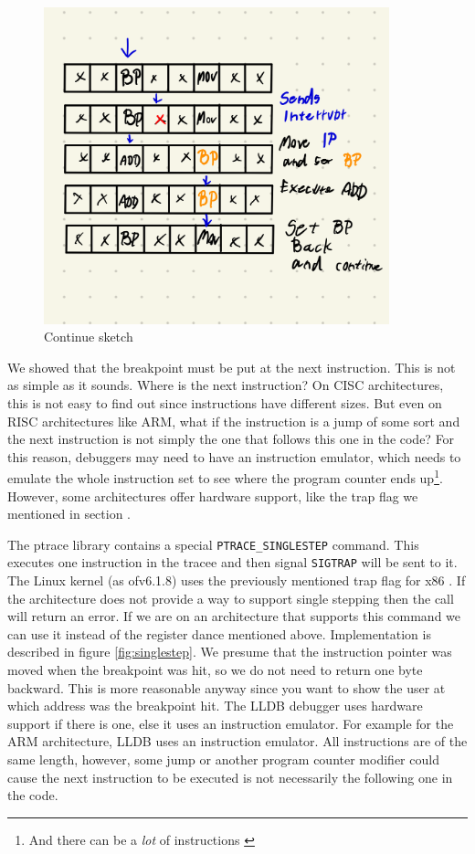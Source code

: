 \begin{figure}\label{fig:continue}
    \centering
    \includegraphics[width=100mm,scale=0.5]{media/breakpoint_tbd}
    \caption{Continue sketch}
\end{figure}

We showed that the breakpoint must be put at the next instruction. This is not
as simple as it sounds. Where is the next instruction? On CISC architectures,
this is not easy to find out since instructions have different sizes. But even
on RISC architectures like ARM, what if the instruction is a jump of some sort
and the next instruction is not simply the one that follows this one in the
code? For this reason, debuggers may need to have an instruction emulator,
which needs to emulate the whole instruction set to see where the program
counter ends up\footnote{And there can be a \textit{lot} of instructions
\cite{intel-manual}}. However, some architectures offer hardware support, like
the trap flag we mentioned in section .

The ptrace library contains a special \texttt{PTRACE\_SINGLESTEP} command. This
executes one instruction in the tracee and then signal \texttt{SIGTRAP} will be
sent to it. The Linux kernel (as ofv6.1.8) uses the previously mentioned trap
flag for x86 \cite{linuxkernel-trapflag}. If the architecture does not provide
a way to support single stepping then the call will return an error. If we are
on an architecture that supports this command we can use it instead of the
register dance mentioned above. Implementation is described in figure
\ref{fig:singlestep}. We presume that the instruction pointer was moved when
the breakpoint was hit, so we do not need to return one byte backward. This is
more reasonable anyway since you want to show the user at which address was the
breakpoint hit. The LLDB \cite{lldb} debugger uses hardware support if there is
one, else it uses an instruction emulator. For example for the ARM
architecture, LLDB uses an instruction emulator. All instructions are of the
same length, however, some jump or another program counter modifier could cause
the next instruction to be executed is not necessarily the following one in the
code.

